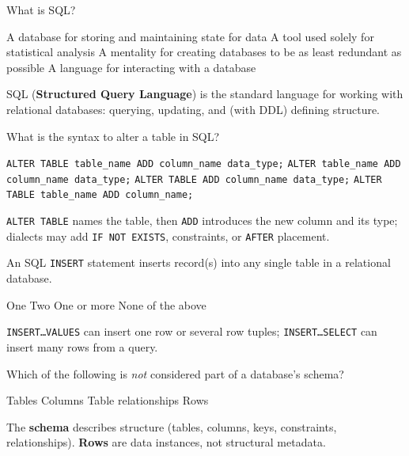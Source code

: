 

\question[4]
What is SQL?
\begin{choices}
  \choice A database for storing and maintaining state for data
  \choice A tool used solely for statistical analysis
  \choice A mentality for creating databases to be as least redundant as possible
  \CorrectChoice A language for interacting with a database
\end{choices}
\begin{solution}
  SQL (\textbf{Structured Query Language}) is the standard language for working with relational databases: querying, updating, and (with DDL) defining structure.
\end{solution}

\question[4]
What is the syntax to alter a table in SQL?
\begin{choices}
  \CorrectChoice \lstinline[style=sqlinline]!ALTER TABLE table_name ADD column_name data_type;!
  \choice \lstinline[style=sqlinline]!ALTER table_name ADD column_name data_type;!
  \choice \lstinline[style=sqlinline]!ALTER TABLE ADD column_name data_type;!
  \choice \lstinline[style=sqlinline]!ALTER TABLE table_name ADD column_name;!
\end{choices}
\begin{solution}
  \texttt{ALTER TABLE} names the table, then \texttt{ADD} introduces the new column and its type; dialects may add \texttt{IF NOT EXISTS}, constraints, or \texttt{AFTER} placement.
\end{solution}

\question[4]
An SQL \lstinline[style=sqlinline]!INSERT! statement inserts \blank[5em] record(s) into any single table in a relational database.
\begin{choices}
  \choice One
  \choice Two
  \CorrectChoice One or more
  \choice None of the above
\end{choices}
\begin{solution}
  \texttt{INSERT\ldots VALUES} can insert one row or several row tuples; \texttt{INSERT\ldots SELECT} can insert many rows from a query.
\end{solution}

\question[4]
Which of the following is \emph{not} considered part of a database's schema?
\begin{choices}
  \choice Tables
  \choice Columns
  \choice Table relationships
  \CorrectChoice Rows
\end{choices}
\begin{solution}
  The \textbf{schema} describes structure (tables, columns, keys, constraints, relationships). \textbf{Rows} are data instances, not structural metadata.
\end{solution}

